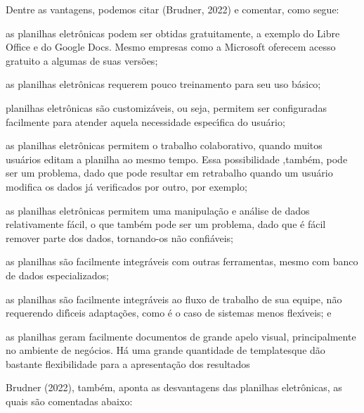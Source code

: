 \documentclass[
12pt,		%
openright,	%
twoside,  %
a4paper,			%
chapter=TITLE,		%
english,			%
french,				%
spanish,			%
brazil				%
]{USPSC-classe/USPSC}
\begin{document}
Dentre as vantagens, podemos citar (Brudner, 2022) e comentar, como segue:


















\begin{alineas}
\item as planilhas eletr\^onicas podem ser obtidas gratuitamente, a exemplo do Libre Office e do Google Docs. Mesmo empresas como a Microsoft oferecem acesso gratuito a algumas de suas vers\~oes;
\item as planilhas eletr\^onicas requerem pouco treinamento para seu uso b\'asico;
\item planilhas eletr\^onicas s\~ao \textquotedbl customiz\'aveis\textquotedbl , ou seja, permitem ser configuradas facilmente para atender aquela necessidade espec\'{\i}fica do usu\'ario;
\item as planilhas eletr\^onicas permitem o trabalho colaborativo, quando muitos usu\'arios editam a planilha ao mesmo tempo. Essa possibilidade ,tamb\'em, pode ser um problema, dado que pode resultar em retrabalho quando um usu\'ario modifica os dados j\'a verificados por outro, por exemplo;
\item as planilhas eletr\^onicas permitem uma manipula\c{c}\~ao e an\'alise de dados relativamente f\'acil, o que tamb\'em pode ser um problema, dado que \'e f\'acil remover parte dos dados, tornando-os n\~ao confi\'aveis;
\item as planilhas s\~ao facilmente integr\'aveis com outras ferramentas, mesmo com banco de dados especializados;
\item as planilhas s\~ao facilmente integr\'aveis ao fluxo de trabalho de sua equipe, n\~ao requerendo dif\'{\i}ceis adapta\c{c}\~oes, como \'e o caso de sistemas menos flex\'{\i}veis; e
\item as planilhas geram facilmente documentos de grande apelo visual, principalmente no ambiente de neg\'ocios. H\'a uma grande quantidade de \textquotedbl templates\textquotedbl  que d\~ao bastante flexibilidade para a apresenta\c{c}\~ao dos resultados
\end{alineas}

 Brudner (2022), tamb\'em, aponta as desvantagens das planilhas eletr\^onicas, as quais s\~ao comentadas abaixo:
\end{document}
